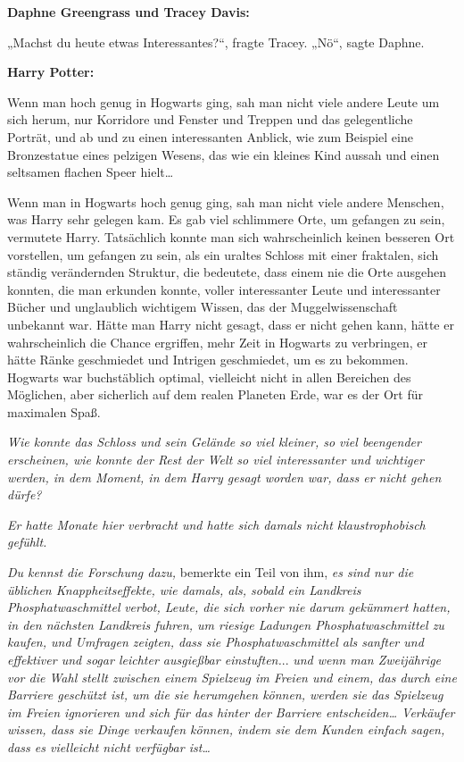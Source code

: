 {\textbf{Daphne Greengrass und Tracey Davis:}

„Machst du heute etwas Interessantes?“, fragte Tracey. „Nö“, sagte Daphne.

\textbf{Harry Potter:}

Wenn man hoch genug in Hogwarts ging, sah man nicht viele andere Leute um sich herum, nur Korridore und Fenster und Treppen und das gelegentliche Porträt, und ab und zu einen interessanten Anblick, wie zum Beispiel eine Bronzestatue eines pelzigen Wesens, das wie ein kleines Kind aussah und einen seltsamen flachen Speer hielt…

Wenn man in Hogwarts hoch genug ging, sah man nicht viele andere Menschen, was Harry sehr gelegen kam. Es gab viel schlimmere Orte, um gefangen zu sein, vermutete Harry. Tatsächlich konnte man sich wahrscheinlich keinen besseren Ort vorstellen, um gefangen zu sein, als ein uraltes Schloss mit einer fraktalen, sich ständig verändernden Struktur, die bedeutete, dass einem nie die Orte ausgehen konnten, die man erkunden konnte, voller interessanter Leute und interessanter Bücher und unglaublich wichtigem Wissen, das der Muggelwissenschaft unbekannt war. Hätte man Harry nicht gesagt, dass er nicht gehen kann, hätte er wahrscheinlich die Chance ergriffen, mehr Zeit in Hogwarts zu verbringen, er hätte Ränke geschmiedet und Intrigen geschmiedet, um es zu bekommen. Hogwarts war buchstäblich optimal, vielleicht nicht in allen Bereichen des Möglichen, aber sicherlich auf dem realen Planeten Erde, war es der Ort für maximalen Spaß.

\emph{Wie konnte das Schloss und sein Gelände so viel kleiner, so viel beengender erscheinen, wie konnte der Rest der Welt so viel interessanter und wichtiger werden, in dem Moment, in dem Harry gesagt worden war, dass er nicht gehen dürfe?}

\emph{Er hatte Monate hier verbracht und hatte sich damals nicht klaustrophobisch gefühlt.}

\emph{Du kennst die Forschung dazu,} bemerkte ein Teil von ihm, \emph{es sind nur die üblichen Knappheitseffekte, wie damals, als, sobald ein Landkreis Phosphatwaschmittel} \emph{verbot, Leute, die sich vorher nie darum gekümmert hatten, in den nächsten Landkreis fuhren, um riesige Ladungen Phosphatwaschmittel zu kaufen, und Umfragen zeigten, dass sie Phosphatwaschmittel als sanfter und effektiver und sogar leichter ausgießbar einstuften.}.. \emph{und wenn man Zweijährige vor die Wahl stellt zwischen einem Spielzeug im Freien und einem, das durch eine Barriere geschützt ist, um die sie herumgehen können, werden sie das Spielzeug im Freien ignorieren und sich für das hinter der Barriere entscheiden… Verkäufer wissen, dass sie Dinge verkaufen können, indem sie dem Kunden einfach sagen, dass es vielleicht nicht verfügbar ist…}

}
